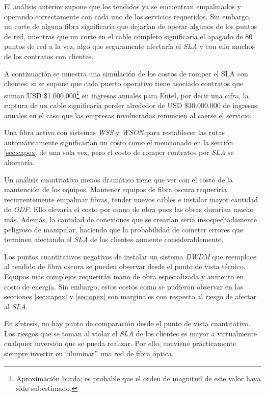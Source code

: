 El análisis anterior supone que los tendidos ya se encuentran
empalmados y operando correctamente con cada uno de los servicios
requeridos. Sin embargo, un corte de alguna fibra significaría que
dejarían de operar algunos de los puntos de red, mientras que un corte
en el cable completo significaría el apagado de 80 puntos de red a la
vez, algo que seguramente afectaría el \emph{SLA} y con ello muchos de
los contratos con clientes.

A continuación se muestra una simulación de los costos de romper el
\textsf{SLA} con clientes: si se supone que cada puerto operativo
tiene asociado contratos que suman USD
\$1.000.000\footnote{Aproximación burda; es probable que el orden de
  magnitud de este valor haya sido subestimado.} en ingresos anuales
para Entel, por decir una cifra, la ruptura de un cable significaría
perder alrededor de USD \$30.000.000 de ingresos anuales en el caso
que las empresas involucradas renuncien al caerse el servicio.

Una fibra activa con sistemas \emph{WSS} y \emph{WSON} para
restablecer las rutas automáticamente significarían un costo como el
mencionado en la sección \ref{sec:capex} de una sola vez, pero el
costo de romper contratos por \emph{SLA} se ahorraría.

Un análisis cuantitativo menos dramático tiene que ver con el costo de
la mantención de los equipos. Mantener equipos de fibra oscura
requeriría recurrentemente empalmar fibras, tender nuevos cables e
instalar mayor cantidad de \emph{ODF}. Ello elevaría el costo por mano
de obra pues las obras durarían mucho más. Además, la cantidad de
conexiones que se crearían sería insospechadamente peligroso de
manipular, haciendo que la probabilidad de cometer errores que
terminen afectando el \emph{SLA} de los clientes aumente
considerablemente.

Los puntos cuantitativos negativos de instalar un sistema \emph{DWDM}
que reemplace al tendido de fibra oscura se pueden observar desde el
punto de vista técnico. Equipos más complejos requerirán mano de obra
especializada y aumento en costo de energía. Sin embargo, estos costos
como se pudieron observar en las secciones \ref{sec:capex} y
\ref{sec:opex} son marginales con respecto al riesgo de afectar al
\emph{SLA}.

En síntesis, no hay punto de comparación desde el punto de vista
cuantitativo. Los riesgos que se toman al violar el \emph{SLA} de los
clientes es mayor a virtualmente cualquier inversión que se pueda
realizar. Por ello, conviene prácticamente siempre invertir en
``iluminar'' una red de fibra óptica.

